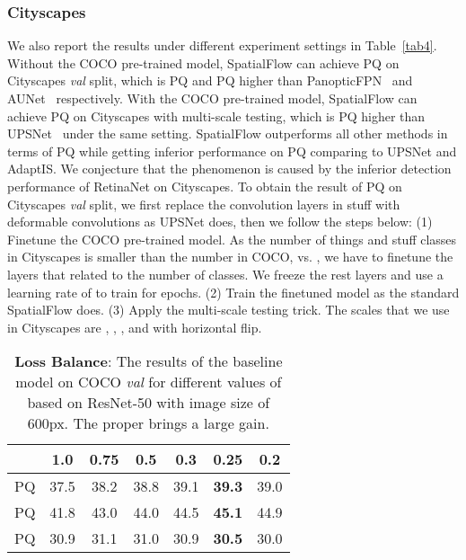 \documentclass[journal,final]{IEEEtran}
\begin{document}
\subsubsection{Cityscapes} 
We also report the results under different experiment settings in Table~\ref{tab4}. Without the COCO pre-trained model, SpatialFlow can achieve  PQ on Cityscapes {\em val} split, which is  PQ and  PQ higher than PanopticFPN~\cite{panopticfpn} and AUNet~\cite{aunet} respectively. With the COCO pre-trained model, SpatialFlow can achieve  PQ on Cityscapes with multi-scale testing, which is  PQ higher than UPSNet~\cite{upsnet} under the same setting. SpatialFlow outperforms all other methods in terms of PQ while getting inferior performance on PQ comparing to UPSNet and AdaptIS. We conjecture that the phenomenon is caused by the inferior detection performance of RetinaNet on Cityscapes. To obtain the result of  PQ on Cityscapes {\em val} split, we first replace the convolution layers in stuff with deformable convolutions as UPSNet does, then we follow the steps below: (1) Finetune the COCO pre-trained model. As the number of things and stuff classes in Cityscapes is smaller than the number in COCO,  vs. , we have to finetune the layers that related to the number of classes. We freeze the rest layers and use a learning rate of  to train for  epochs. (2) Train the finetuned model as the standard SpatialFlow does. (3) Apply the multi-scale testing trick. The scales that we use in Cityscapes are , , , and  with horizontal flip.
\begin{table}
  \centering
  \caption{\textbf{Loss Balance}: The results of the baseline model on COCO {\em val} for different values of  based on ResNet-50 with image size of 600px. The proper  brings a large gain.}
  \begin{tabular}{lcccccc}
    \toprule
     & 1.0 & 0.75 & 0.5 & 0.3 & \textbf{0.25} & 0.2\\
    \midrule
    \midrule
    PQ & 37.5 & 38.2 & 38.8 & 39.1 & \textbf{39.3} & 39.0 \\
    PQ & 41.8 & 43.0 & 44.0 & 44.5 & \textbf{45.1} & 44.9\\
    PQ & 30.9 & 31.1 & 31.0 & 30.9 & \textbf{30.5} & 30.0\\
    \bottomrule
  \end{tabular}
  \label{tab6}
\end{table}
\end{document}
